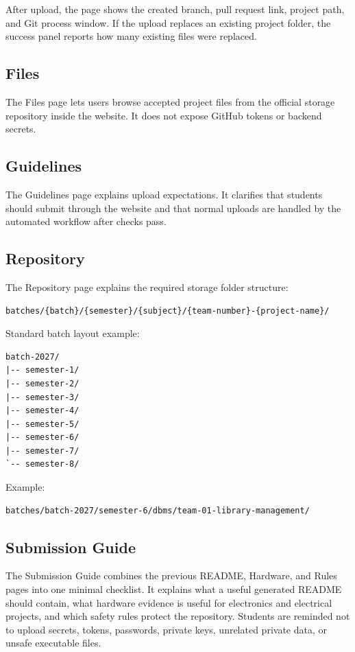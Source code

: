 \documentclass[12pt,a4paper]{article}
\begin{document}
After upload, the page shows the created branch, pull request link, project path, and Git process window.
If the upload replaces an existing project folder, the success panel reports how many existing files were replaced.

\subsection{Files}

The Files page lets users browse accepted project files from the official storage repository inside the website. It does not expose GitHub tokens or backend secrets.

\subsection{Guidelines}

The Guidelines page explains upload expectations. It clarifies that students should submit through the website and that normal uploads are handled by the automated workflow after checks pass.

\subsection{Repository}

The Repository page explains the required storage folder structure:

\begin{lstlisting}
batches/{batch}/{semester}/{subject}/{team-number}-{project-name}/
\end{lstlisting}

Standard batch layout example:

\begin{lstlisting}
batch-2027/
|-- semester-1/
|-- semester-2/
|-- semester-3/
|-- semester-4/
|-- semester-5/
|-- semester-6/
|-- semester-7/
`-- semester-8/
\end{lstlisting}

Example:

\begin{lstlisting}
batches/batch-2027/semester-6/dbms/team-01-library-management/
\end{lstlisting}

\subsection{Submission Guide}

The Submission Guide combines the previous README, Hardware, and Rules pages into one minimal checklist. It explains what a useful generated README should contain, what hardware evidence is useful for electronics and electrical projects, and which safety rules protect the repository. Students are reminded not to upload secrets, tokens, passwords, private keys, unrelated private data, or unsafe executable files.
\end{document}
